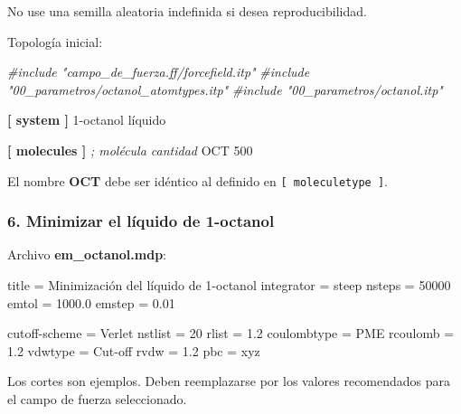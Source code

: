 \documentclass[
  spanish,
  11pt,
  a4paper]{article}
\newenvironment{Shaded}{\begin{snugshade}}{\end{snugshade}}
\newcommand{\CommentTok}[1]{\textcolor[rgb]{0.56,0.35,0.01}{\textit{#1}}}
\newcommand{\DataTypeTok}[1]{\textcolor[rgb]{0.13,0.29,0.53}{#1}}
\newcommand{\DecValTok}[1]{\textcolor[rgb]{0.00,0.00,0.81}{#1}}
\newcommand{\FloatTok}[1]{\textcolor[rgb]{0.00,0.00,0.81}{#1}}
\newcommand{\KeywordTok}[1]{\textcolor[rgb]{0.13,0.29,0.53}{\textbf{#1}}}
\newcommand{\OtherTok}[1]{\textcolor[rgb]{0.56,0.35,0.01}{#1}}
\newcommand{\StringTok}[1]{\textcolor[rgb]{0.31,0.60,0.02}{#1}}
\begin{document}
No use una semilla aleatoria indefinida si desea reproducibilidad.

Topología inicial:

\begin{Shaded}
\begin{Highlighting}[]
\CommentTok{\#include "campo\_de\_fuerza.ff/forcefield.itp"}
\CommentTok{\#include "00\_parametros/octanol\_atomtypes.itp"}
\CommentTok{\#include "00\_parametros/octanol.itp"}

\KeywordTok{[ system ]}
\DataTypeTok{1{-}octanol líquido}

\KeywordTok{[ molecules ]}
\CommentTok{; molécula    cantidad}
\DataTypeTok{OCT           500}
\end{Highlighting}
\end{Shaded}

El nombre \textbf{OCT} debe ser idéntico al definido en
\texttt{{[}\ moleculetype\ {]}}.

\subsubsection{6. Minimizar el líquido de
1-octanol}\label{minimizar-el-luxedquido-de-1-octanol}

Archivo \textbf{em\_octanol.mdp}:

\begin{Shaded}
\begin{Highlighting}[]
\DataTypeTok{title           }\OtherTok{=}\StringTok{ Minimización del líquido de 1{-}octanol}
\DataTypeTok{integrator      }\OtherTok{=}\StringTok{ steep}
\DataTypeTok{nsteps          }\OtherTok{=}\StringTok{ }\DecValTok{50000}
\DataTypeTok{emtol           }\OtherTok{=}\StringTok{ }\FloatTok{1000.0}
\DataTypeTok{emstep          }\OtherTok{=}\StringTok{ }\FloatTok{0.01}

\DataTypeTok{cutoff{-}scheme   }\OtherTok{=}\StringTok{ Verlet}
\DataTypeTok{nstlist         }\OtherTok{=}\StringTok{ }\DecValTok{20}
\DataTypeTok{rlist           }\OtherTok{=}\StringTok{ }\FloatTok{1.2}
\DataTypeTok{coulombtype     }\OtherTok{=}\StringTok{ PME}
\DataTypeTok{rcoulomb        }\OtherTok{=}\StringTok{ }\FloatTok{1.2}
\DataTypeTok{vdwtype         }\OtherTok{=}\StringTok{ Cut{-}off}
\DataTypeTok{rvdw            }\OtherTok{=}\StringTok{ }\FloatTok{1.2}
\DataTypeTok{pbc             }\OtherTok{=}\StringTok{ xyz}
\end{Highlighting}
\end{Shaded}

Los cortes son ejemplos. Deben reemplazarse por los valores recomendados
para el campo de fuerza seleccionado.
\end{document}
